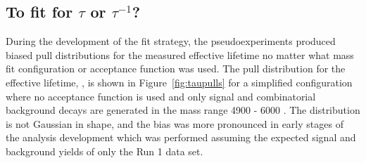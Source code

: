 {\subsection{To fit for $\tau$ or $\tau^{-1}$?}
\label{sec:tauORinvtau}
During the development of the fit strategy, the pseudoexperiments produced biased pull distributions for the measured \bsmumu effective lifetime no matter what mass fit configuration or acceptance function was used. The pull distribution for the effective lifetime, \tmumu, is shown in Figure~\ref{fig:taupulls} for a simplified configuration where no acceptance function is used and only signal and combinatorial background decays are generated in the mass range 4900 - 6000 \mevcc. The distribution is not Gaussian in shape, and the bias was more pronounced in early stages of the analysis development which was performed assuming the expected signal and background yields of only the Run 1 data set.%

}

